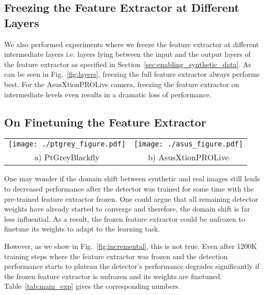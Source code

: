 \documentclass[10pt,twocolumn,letterpaper]{article}
\newcommand{\comment}[1]{}
\newcommand{\asus}[0]{AsusXtionPROLive\xspace}
\newcommand{\ptgrey}[0]{PtGreyBlackfly\xspace}
\begin{document}
\subsection{Freezing the Feature Extractor at Different Layers}
We also performed experiments where we freeze the feature extractor at different
intermediate layers i.e. layers lying between the input and the output layers of
the feature extractor as specified in Section~\ref{sec:enabling_synthetic_data}.
As can  be seen  in Fig.~\ref{fig:layers}, freezing  the full  feature extractor
always performs best.   For the \asus camera, freezing the  feature extractor on
intermediate levels even results in a dramatic loss of performance.





\subsection{On Finetuning the Feature Extractor}
\label{sec:unfreezing}

\begin{figure*}[ht]
\begin{center}
\begin{tabular}{cc}
\texttt{[image: ./ptgrey\_figure.pdf]} &
\texttt{[image: ./asus\_figure.pdf]} \\
a) \ptgrey &
b) \asus \\
\end{tabular}
\end{center}
\caption{\label{fig:incremental}  Finetuning the  feature extractor  after 400K,
  900K and 1200K steps where the pre-trained feature extractor was frozen for the \ptgrey and the \asus  cameras.  We show results
  for the InceptionResnet~\cite{inception_resnet} and Resnet101~\cite{resnet101}
  architectures.}
\end{figure*}

One may wonder if the domain shift between synthetic and real images still leads
to decreased performance  after the detector was trained for  some time with the
pre-trained feature extractor frozen.  One could argue that all remaining detector weights
have already started to converge and therefore, the domain shift \comment{does not matter
any more} is far less influential.  As a  result, the frozen feature extractor could  be unfrozen 
to finetune its weights to adapt to the learning task.

However, as we show in Fig.~\ref{fig:incremental},  this is not true.  Even 
after  1200K training  steps  where the  feature extractor  was  frozen and  the
detection  performance starts  to  plateau the  detector's performance  degrades
significantly    if    the    frozen     feature    extractor    is    unfrozen and its weights are finetuned.
Table~\ref{tab:main_exp} gives the corresponding numbers.
\end{document}

